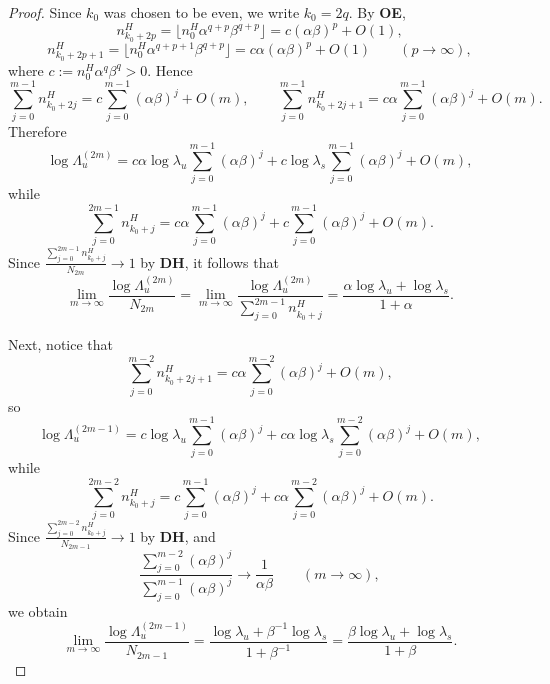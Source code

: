 \documentclass{amsart}
\theoremstyle{plain}
\theoremstyle{definition}
\theoremstyle{remark}
\numberwithin{equation}{section}
\begin{document}
\begin{proof}
Since $k_0$ was chosen to be even, we write $k_0=2q$.
By {\bf OE},
\[
n_{k_0+2p}^H
=
\lfloor n_0^H\alpha^{q+p}\beta^{q+p}\rfloor
=
c(\alpha\beta)^p+O(1),
\]
\[
n_{k_0+2p+1}^H
=
\lfloor n_0^H\alpha^{q+p+1}\beta^{q+p}\rfloor
=
c\alpha(\alpha\beta)^p+O(1)
\qquad (p\to\infty),
\]
where $c:=n_0^H\alpha^q\beta^q>0$.
Hence
\[
\sum_{j=0}^{m-1}n_{k_0+2j}^H
=
c\sum_{j=0}^{m-1}(\alpha\beta)^j+O(m),
\qquad
\sum_{j=0}^{m-1}n_{k_0+2j+1}^H
=
c\alpha\sum_{j=0}^{m-1}(\alpha\beta)^j+O(m).
\]
Therefore
\[
\log\Lambda_u^{(2m)}
=
c\alpha \log\lambda_u \sum_{j=0}^{m-1}(\alpha\beta)^j
+
c\log\lambda_s\sum_{j=0}^{m-1}(\alpha\beta)^j
+O(m),
\]
while
\[
\sum_{j=0}^{2m-1}n_{k_0+j}^H
=
c\alpha\sum_{j=0}^{m-1}(\alpha\beta)^j
+
c\sum_{j=0}^{m-1}(\alpha\beta)^j
+O(m).
\]
Since $\frac{\sum_{j=0}^{2m-1}n_{k_0+j}^H}{N_{2m}}\to 1$ by {\bf DH},
it follows that
\[
\lim_{m\to\infty}\frac{\log\Lambda_u^{(2m)}}{N_{2m}}
=
\lim_{m\to\infty}\frac{\log\Lambda_u^{(2m)}}{\sum_{j=0}^{2m-1}n_{k_0+j}^H}
=
\frac{\alpha\log\lambda_u+\log\lambda_s}{1+\alpha}.
\]

Next, notice that
\[
\sum_{j=0}^{m-2}n_{k_0+2j+1}^H
=
c\alpha\sum_{j=0}^{m-2}(\alpha\beta)^j+O(m),
\]
so
\[
\log\Lambda_u^{(2m-1)}
=
c\log\lambda_u\sum_{j=0}^{m-1}(\alpha\beta)^j
+
c\alpha\log\lambda_s\sum_{j=0}^{m-2}(\alpha\beta)^j
+O(m),
\]
while
\[
\sum_{j=0}^{2m-2}n_{k_0+j}^H
=
c\sum_{j=0}^{m-1}(\alpha\beta)^j
+
c\alpha\sum_{j=0}^{m-2}(\alpha\beta)^j
+O(m).
\]
Since $\frac{\sum_{j=0}^{2m-2}n_{k_0+j}^H}{N_{2m-1}}\to 1$ by {\bf DH}, and
\[
\frac{\sum_{j=0}^{m-2}(\alpha\beta)^j}{\sum_{j=0}^{m-1}(\alpha\beta)^j}\to \frac{1}{\alpha\beta}
\qquad (m\to\infty),
\]
we obtain
\[
\lim_{m\to\infty}\frac{\log\Lambda_u^{(2m-1)}}{N_{2m-1}}
=
\frac{\log\lambda_u+\beta^{-1}\log\lambda_s}{1+\beta^{-1}}
=
\frac{\beta\log\lambda_u+\log\lambda_s}{1+\beta}.
\]
\end{proof}
\end{document}

